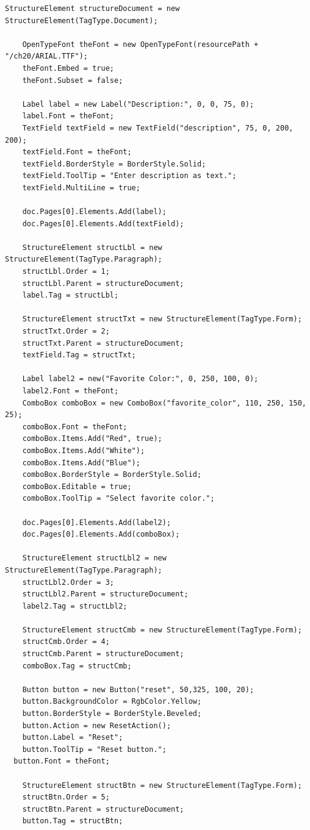 \documentclass[american]{tufte-book}
\numberwithin{equation}{section}
\numberwithin{figure}{section}
\begin{document}
{{\begin{lstlisting}[caption={Manually tagging a Form.},label={lis:form-Manually-tagging-a},basicstyle={\footnotesize\ttfamily},breaklines=true]
    StructureElement structureDocument = new StructureElement(TagType.Document);

    OpenTypeFont theFont = new OpenTypeFont(resourcePath + "/ch20/ARIAL.TTF");
    theFont.Embed = true;
    theFont.Subset = false;

    Label label = new Label("Description:", 0, 0, 75, 0);
    label.Font = theFont;
    TextField textField = new TextField("description", 75, 0, 200, 200);
    textField.Font = theFont;
    textField.BorderStyle = BorderStyle.Solid;
    textField.ToolTip = "Enter description as text.";
    textField.MultiLine = true;

    doc.Pages[0].Elements.Add(label);
    doc.Pages[0].Elements.Add(textField);

    StructureElement structLbl = new StructureElement(TagType.Paragraph);
    structLbl.Order = 1;
    structLbl.Parent = structureDocument;
    label.Tag = structLbl;

    StructureElement structTxt = new StructureElement(TagType.Form);
    structTxt.Order = 2;
    structTxt.Parent = structureDocument;
    textField.Tag = structTxt;

    Label label2 = new("Favorite Color:", 0, 250, 100, 0);
    label2.Font = theFont;
    ComboBox comboBox = new ComboBox("favorite_color", 110, 250, 150, 25);
    comboBox.Font = theFont;
    comboBox.Items.Add("Red", true);
    comboBox.Items.Add("White");
    comboBox.Items.Add("Blue");
    comboBox.BorderStyle = BorderStyle.Solid;
    comboBox.Editable = true;
    comboBox.ToolTip = "Select favorite color.";

    doc.Pages[0].Elements.Add(label2);
    doc.Pages[0].Elements.Add(comboBox);

    StructureElement structLbl2 = new StructureElement(TagType.Paragraph);
    structLbl2.Order = 3;
    structLbl2.Parent = structureDocument;
    label2.Tag = structLbl2;

    StructureElement structCmb = new StructureElement(TagType.Form);
    structCmb.Order = 4;
    structCmb.Parent = structureDocument;
    comboBox.Tag = structCmb;

    Button button = new Button("reset", 50,325, 100, 20);
    button.BackgroundColor = RgbColor.Yellow;
    button.BorderStyle = BorderStyle.Beveled;
    button.Action = new ResetAction();
    button.Label = "Reset";
    button.ToolTip = "Reset button.";
  button.Font = theFont;

    StructureElement structBtn = new StructureElement(TagType.Form);
    structBtn.Order = 5;
    structBtn.Parent = structureDocument;
    button.Tag = structBtn;


\end{lstlisting}}}
\end{document}
